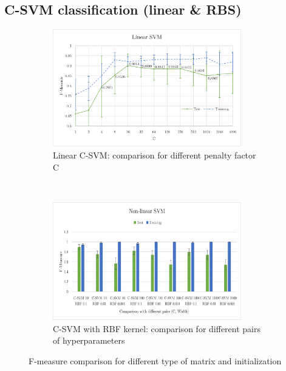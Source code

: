 \documentclass[a4paper,10pt]{article}
\begin{document}
\subsection{C-SVM classification (linear \& RBS)}

\begin{figure}[H]
\centering
    \begin{subfigure}[t]{0.45\textwidth}
      \centering
      \includegraphics[width=0.9\textwidth]{pictures/linear-SVM}
      \caption{Linear C-SVM: comparison for different penalty factor C}
      \label{fig:linear-SVM}
     \end{subfigure}
      ~
    \begin{subfigure}[t]{0.45\textwidth}
      \centering
      \includegraphics[width=0.9\textwidth]{pictures/non-linear-SVM}
      \caption{C-SVM with RBF kernel: comparison for different pairs of hyperparameters}
      \label{fig:non-linear-SVM}
     \end{subfigure}
     \caption{F-measure comparison for different type of matrix and initialization}
\end{figure}
\end{document}
